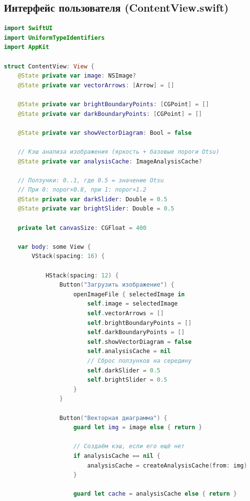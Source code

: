 \documentclass[12pt,a4paper]{article}
\numberwithin{equation}{section}
\begin{document}
\subsection{Интерфейс пользователя (ContentView.swift)}
\begin{lstlisting}[language=Swift, caption=Пользовательский интерфейс, label=lst:ui]
import SwiftUI
import UniformTypeIdentifiers
import AppKit

struct ContentView: View {
    @State private var image: NSImage?
    @State private var vectorArrows: [Arrow] = []

    @State private var brightBoundaryPoints: [CGPoint] = []
    @State private var darkBoundaryPoints: [CGPoint] = []

    @State private var showVectorDiagram: Bool = false

    // Кэш анализа изображения (яркость + базовые пороги Otsu)
    @State private var analysisCache: ImageAnalysisCache?

    // Ползунки: 0..1, где 0.5 = значение Otsu
    // При 0: порог×0.8, при 1: порог×1.2
    @State private var darkSlider: Double = 0.5
    @State private var brightSlider: Double = 0.5

    private let canvasSize: CGFloat = 400

    var body: some View {
        VStack(spacing: 16) {

            HStack(spacing: 12) {
                Button("Загрузить изображение") {
                    openImageFile { selectedImage in
                        self.image = selectedImage
                        self.vectorArrows = []
                        self.brightBoundaryPoints = []
                        self.darkBoundaryPoints = []
                        self.showVectorDiagram = false
                        self.analysisCache = nil
                        // Сброс ползунков на середину
                        self.darkSlider = 0.5
                        self.brightSlider = 0.5
                    }
                }

                Button("Векторная диаграмма") {
                    guard let img = image else { return }
                    
                    // Создаём кэш, если его ещё нет
                    if analysisCache == nil {
                        analysisCache = createAnalysisCache(from: img)
                    }
                    
                    guard let cache = analysisCache else { return }
                    

\end{lstlisting}
\end{document}
